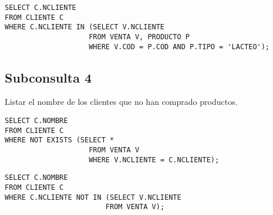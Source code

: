 \documentclass{templateNote}
\begin{document}
\begin{tcolorbox}
    [colback=gray!5!white,colframe=gray!75!black,fonttitle=\bfseries,title=SQL]
    \begin{sqlcode}
    \end{sqlcode}
    \begin{verbatim}
SELECT C.NCLIENTE
FROM CLIENTE C
WHERE C.NCLIENTE IN (SELECT V.NCLIENTE
                    FROM VENTA V, PRODUCTO P
                    WHERE V.COD = P.COD AND P.TIPO = 'LACTEO');
    \end{verbatim}
\end{tcolorbox}

\subsection{Subconsulta 4}
Listar el nombre de los clientes que no han comprado productos.
\begin{tcolorbox}
    [colback=gray!5!white,colframe=gray!75!black,fonttitle=\bfseries,title=SQL]
    \begin{sqlcode}
    \end{sqlcode}
    \begin{verbatim}
SELECT C.NOMBRE
FROM CLIENTE C
WHERE NOT EXISTS (SELECT *
                    FROM VENTA V
                    WHERE V.NCLIENTE = C.NCLIENTE);
    \end{verbatim}
\end{tcolorbox}

\begin{tcolorbox}
    [colback=gray!5!white,colframe=gray!75!black,fonttitle=\bfseries,title=SQL]
    \begin{sqlcode}
    \end{sqlcode}
    \begin{verbatim}
SELECT C.NOMBRE
FROM CLIENTE C
WHERE C.NCLIENTE NOT IN (SELECT V.NCLIENTE
                        FROM VENTA V);
    \end{verbatim}
\end{tcolorbox}

\newpage
\end{document}
